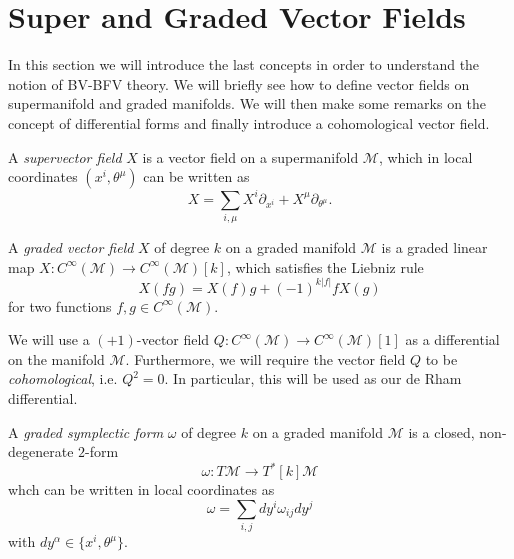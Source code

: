 \section{Super and Graded Vector Fields}
\label{sec:Sup_vector_fields}

In this section we will introduce the last concepts in order to understand the notion of BV-BFV theory.
We will briefly see how to define vector fields on supermanifold and graded manifolds.
We will then make some remarks on the concept of differential forms and finally introduce a cohomological vector field.

\begin{definition}
    A \emph{supervector field} $X$ is a vector field on a supermanifold $\mathcal{M}$, which in local coordinates $(x^i, \theta^\mu)$ can be written as
    \begin{equation*}
        X = \sum_{i, \mu} X^i \partial_{x^i} + X^\mu \partial_{\theta^\mu} .
    \end{equation*}
\end{definition}

\begin{definition}
    A \emph{graded vector field} $X$ of degree $k$ on a graded manifold $\mathcal{M}$ is a graded linear map $X: C^\infty(\mathcal{M}) \rightarrow C^\infty(\mathcal{M})[k]$, which satisfies the Liebniz rule
    \begin{equation*}
        X(fg) = X(f)g + (-1)^{k|f|} f X(g)
    \end{equation*}
    for two functions $f,g \in C^\infty(\mathcal{M})$.
\end{definition}

We will use a $(+1)$-vector field $Q: C^\infty(\mathcal{M}) \rightarrow C^\infty(\mathcal{M})[1]$ as a differential on the manifold $\mathcal{M}$.
Furthermore, we will require the vector field $Q$ to be \emph{cohomological}, i.e. $Q^2 = 0$.
In particular, this will be used as our de Rham differential.

\begin{definition}
    A \emph{graded symplectic form} $\omega$ of degree $k$ on a graded manifold $\mathcal{M}$ is a closed, non-degenerate $2$-form
    \begin{equation*}
        \omega : T\mathcal{M} \rightarrow T^*[k]\mathcal{M}
    \end{equation*}
    whch can be written in local coordinates as
    \begin{equation*}
        \omega = \sum_{i,j} dy^i \omega_{ij} dy^j
    \end{equation*}
    with $dy^\alpha \in \{x^i, \theta^\mu\}$.
\end{definition}